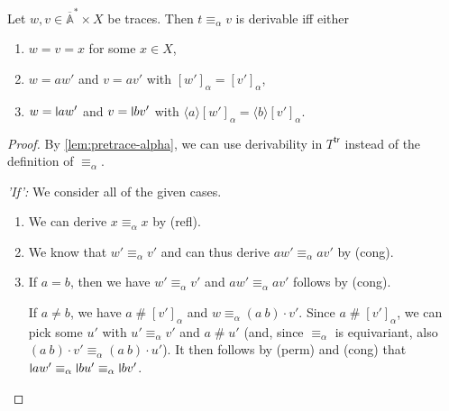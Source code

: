 \documentclass[a4paper,UKenglish,cleveref,thm-restate,numberwithinsect,final]{lipics-v2021}
\newcommand{\trc}{\mathsf{tr}}
\newcommand{\Names}{\mathbb{A}}
\newcommand{\barNames}{\overline{\Names}}
\newcommand{\alphaeq}{\equiv_\alpha}
\newcommand{\fresh}{\mathbin{\#}}
\newcommand{\bind}[1]{\langle #1\rangle}
\theoremstyle{plain}
\newcommand{\midmid}{\hspace{0.2ex}{\rule[-0.1ex]{0.6pt}{1.65ex}}\hspace{0.2ex}}
\newcommand{\newletter}[1]{{\midmid}#1}
\numberwithin{equation}{section}
\newcommand{\+}[1]{\mathcal{#1}\xspace}
\theoremstyle{definition}
\begin{document}
\begin{lemma}\label{lem:inductive-alphaeq}
  Let \(w, v \in \barNames^* \times X\) be traces. Then \(t \alphaeq v\) is derivable iff either
  \begin{enumerate}
    \item\label{itm:inductive-alphaeq-variable} \(w = v = x\) for some \(x \in X\),
    \item\label{itm:inductive-alphaeq-free} \(w = aw'\) and \(v = av'\) with \([w']_\alpha = [v']_\alpha\),
    \item\label{itm:inductive-alphaeq-bound} \(w = \newletter{a}w'\) and \(v = \newletter{b}v'\) with \(\bind{a}[w']_\alpha = \bind{b}[v']_\alpha\).
  \end{enumerate}
\end{lemma}

\begin{proof}
  By \cref{lem:pretrace-alpha}, we can use derivability in \(T^\trc\) instead of the definition of \(\alphaeq\).

  \noindent\emph{'If':}
  We consider all of the given cases.
  \begin{enumerate}
    \item
      We can derive \(x \alphaeq x\) by (refl).
    \item
      We know that \(w' \alphaeq v'\) and can thus derive \(aw' \alphaeq av'\) by (cong).
    \item
      If \(a = b\), then we have \(w' \alphaeq v'\) and \(aw' \alphaeq av'\) follows by (cong).

      If \(a \neq b\), we have \(a \fresh [v']_\alpha\) and \(w \alphaeq (a\ b) \cdot v'\).
      Since \(a \fresh [v']_\alpha\), we can pick some \(u'\) with \(u' \alphaeq v'\) and \(a \fresh u'\) (and, since $\alphaeq$ is equivariant, also \((a\ b) \cdot v' \alphaeq (a\ b) \cdot u'\)).
      It then follows by (perm) and (cong) that $\newletter{a}w' \alphaeq \newletter{b}u' \alphaeq \newletter{b}v'$.
  \end{enumerate}


\end{proof}
\end{document}
